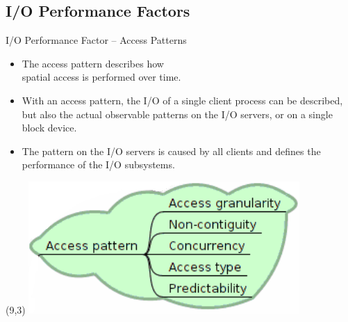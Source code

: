 \documentclass[compress,11pt,xcolor=svgnames,aspectratio=169]{beamer}
\begin{document}
\subsection{I/O Performance Factors}

\begin{frame}[fragile]{I/O Performance Factor -- Access Patterns}

\vspace*{0.6cm}

\begin{itemize}
\setlength\itemsep{1cm}

  \item The access pattern describes how\\ spatial access is performed over time.

  \item With an access pattern, the I/O of a single client process can be described, but also the actual observable patterns on the I/O servers, or on a single block device.

  \item The pattern on the I/O servers is caused by all clients and defines the performance of the I/O subsystems.

\end{itemize}

\begin{textblock}{2}(9,3)
   \includegraphics[scale=0.5]{fig/tree-io-ac-pat}
\end{textblock}



\nocite{pio-sc17}

\end{frame}
\end{document}
